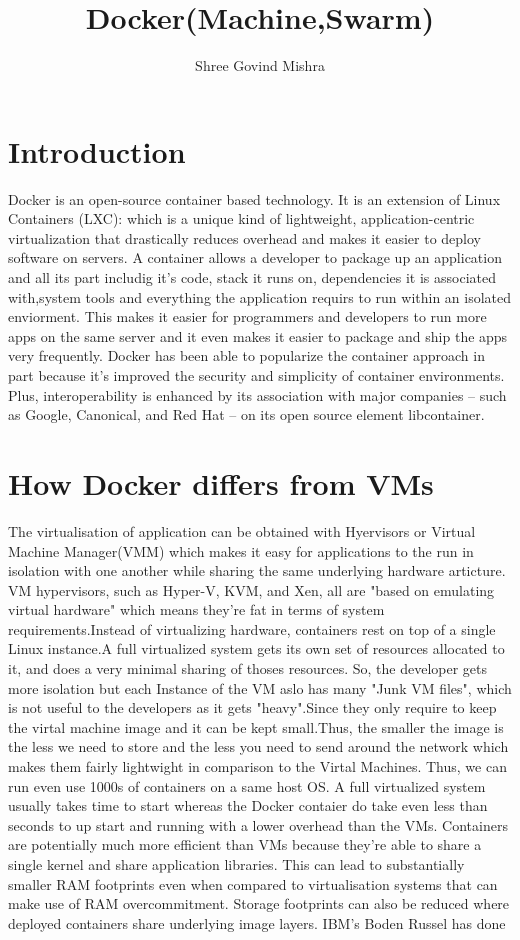 \documentclass[9pt,twocolumn,twoside]{styles/osajnl}
\title{Docker(Machine,Swarm)}
\author[1]{Shree Govind Mishra}
\affil[1]{School of Informatics and Computing, Bloomington, IN 47408, U.S.A.}
\affil[*]{Corresponding authors:shremish@indiana.edu}
\begin{document}
\maketitle


\section{Introduction}
\cite{www-docker-2}Docker is an open-source container based
technology. It is an extension of Linux Containers (LXC): which is a
unique kind of lightweight, application-centric virtualization that
drastically reduces overhead and makes it easier to deploy software on
servers. A container allows a developer to package up an application
and all its part includig it's code, stack it runs on, dependencies it
is associated with,system tools and everything the application requirs
to run within an isolated enviorment. This makes it easier for
programmers and developers to run more apps on the same server and it
even makes it easier to package and ship the apps very frequently.
Docker has been able to popularize the container approach in part
because it’s improved the security and simplicity of container
environments. Plus, interoperability is enhanced by its association
with major companies – such as Google, Canonical, and Red Hat – on its
open source element libcontainer.

\section{How Docker differs from VMs}

The virtualisation of application can be obtained with Hyervisors or
Virtual Machine Manager(VMM) which makes it easy for applications to
the run in isolation with one another while sharing the same
underlying hardware articture. VM hypervisors, such as Hyper-V, KVM,
and Xen, all are "based on emulating virtual hardware" which means
they’re fat in terms of system requirements.Instead of virtualizing
hardware, containers rest on top of a single Linux instance.A full
virtualized system gets its own set of resources allocated to it, and
does a very minimal sharing of thoses resources. So, the developer
gets more isolation but each Instance of the VM aslo has many "Junk VM
files", which is not useful to the developers as it gets "heavy".Since
they only require to keep the virtal machine image and it can be kept
small.Thus, the smaller the image is the less we need to store and the
less you need to send around the network which makes them fairly
lightwight in comparison to the Virtal Machines. Thus, we can run even
use 1000s of containers on a same host OS.
\cite{www-stackoverflow-docker}A full virtualized system usually
takes time to start whereas the Docker contaier do take even less than
seconds to up start and running with a lower overhead than the VMs.
Containers are potentially much more efficient than VMs because
they’re able to share a single kernel and share application libraries.
This can lead to substantially smaller RAM footprints even when
compared to virtualisation systems that can make use of RAM
overcommitment.  Storage footprints can also be reduced where deployed
containers share underlying image layers. IBM’s Boden Russel has done
\end{document}
